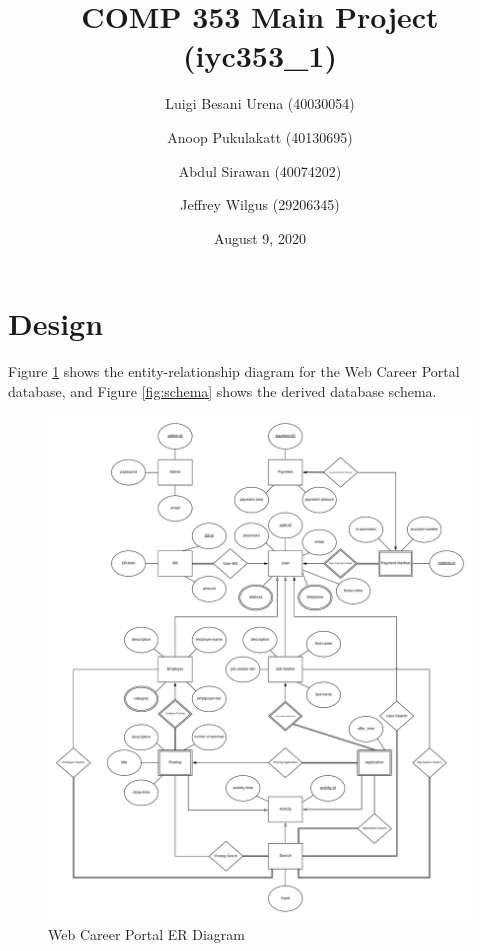 \documentclass{article}
\title{COMP 353 Main Project (iyc353\_1)}
\author{Luigi Besani Urena (40030054) \and Anoop Pukulakatt (40130695) \and Abdul Sirawan (40074202)
    \and Jeffrey Wilgus (29206345)}
\date{August 9, 2020}
\begin{document}
    \maketitle
    \thispagestyle{empty}
    \newpage
    \clearpage
    \section{Design}
        \par Figure \ref{fig:erd} shows the entity-relationship diagram for the Web Career Portal database, and Figure
        \ref{fig:schema} shows the derived database schema. \par
        \begin{figure}[h]
            \centering
            \includegraphics[scale=0.1]{erd}
            \caption{Web Career Portal ER Diagram}
            \label{fig:erd}
        \end{figure}
\end{document}
